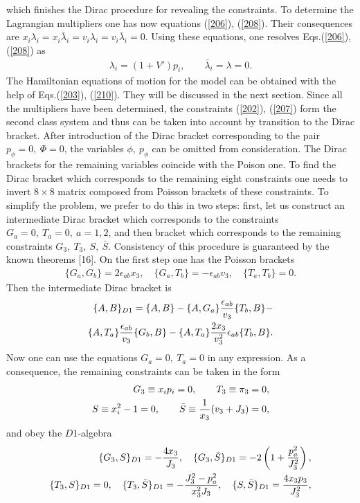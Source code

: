 \documentclass[paper a4]{article}
\begin{document}
which finishes the Dirac procedure for revealing the constraints.
To determine the Lagrangian multipliers one has now equations
(\ref{206}), (\ref{208}). Their consequences are
$x_i\lambda_i=
x_i\bar\lambda_i=
v_i\lambda_i=
v_i\bar\lambda_i=0$.
Using these equations, one resolves Eqs.(\ref{206}), (\ref{208}) as
\begin{eqnarray}\label{210}
\lambda_i=(1+V')p_i, \qquad \bar\lambda_i=\lambda=0.
\end{eqnarray}
The Hamiltonian equations of motion for the model can be obtained with
the help of Eqs.(\ref{203}), (\ref{210}).
They will be discussed in the next section.
Since all the multipliers have been determined, the constraints
(\ref{202}), (\ref{207}) form the second class system and thus can be
taken into account by transition to the Dirac bracket.
After introduction of the Dirac bracket corresponding to the pair
$p_{\phi}=0, ~ \Phi=0$, the variables $\phi, ~ p_{\phi}$ can be
omitted from
consideration. The Dirac brackets for the remaining variables coincide
with the Poison one. To find the Dirac bracket which corresponds
to the remaining eight constraints one
needs to invert $8\times 8$ matrix composed from
Poisson brackets of these constraints. To simplify the problem,
we prefer to do this in two steps: first, let us construct an
intermediate Dirac
bracket which corresponds to the constraints $G_a=0, ~ T_a=0, ~
a=1,2$, and then bracket which corresponds to the remaining
constraints $G_3, ~ T_3, ~ S, ~ \bar S$. Consistency of this procedure is
guaranteed by the known theorems [16]. On the first step one has the
Poisson brackets
\begin{eqnarray}\label{211}
\{G_a, G_b\}=2\epsilon_{ab}x_3, \quad
\{G_a, T_b\}=-\epsilon_{ab}v_3, \quad
\{T_a, T_b\}=0.
\end{eqnarray}
Then the intermediate Dirac bracket is
\begin{eqnarray}\label{212}
\{A, B\}_{D1}=\{A, B\}-\{A, G_a\}\frac{\epsilon_{ab}}{v_3}\{T_b, B\}- \cr
\{A, T_a\}\frac{\epsilon_{ab}}{v_3}\{G_b, B\}-
\{A, T_a\}\frac{2x_3}{v_3^2}\epsilon_{ab}\{T_b, B\}.
\end{eqnarray}
Now one can use the equations $G_a=0, ~ T_a=0$ in any expression.
As a consequence, the remaining constraints can be taken in the form
\begin{eqnarray}\label{213}
G_3\equiv x_ip_i=0, \qquad
T_3\equiv\pi_3=0, \cr
S\equiv x_i^2-1=0, \qquad
\bar S\equiv\frac{1}{x_3}(v_3+J_3)=0,
\end{eqnarray}
and obey the  $D1$-algebra
\begin{eqnarray}\label{214}
\{G_3, S\}_{D1}=-\frac{4x_3}{J_3}, \quad \{G_3, \bar S\}_{D1}
=-2\left(1+\frac{p_a^2}{J_3^2}\right), \cr
\{T_3, S\}_{D1}=0, \quad
\{T_3, \bar S\}_{D1}=-\frac{J_3^2-p_a^2}{x_3^2J_3}, \quad
\{S, \bar S\}_{D1}=\frac{4x_3p_3}{J_3^2},
\end{eqnarray}
\end{document}
